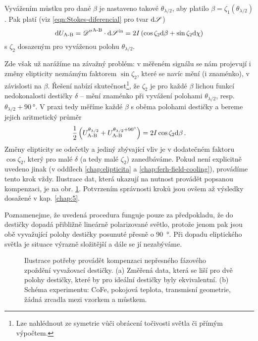 Vyvážením můstku pro dané $\beta$ je nastaveno takové $\theta_{\lambda/2}$, aby platilo $\beta=\zeta_1(\theta_{\lambda/2})$.
Pak platí (viz \eqref{eqn:Stokes-diferencial} pro tvar $\textrm{d}\mathscr{S}$)
\begin{equation}
\label{eqn:mustek-s-elipticitou}
    \textrm{d}U_\textrm{A-B} = {\mathscr{D}''}^\textrm{A-B} \cdot \textrm{d}\mathscr{S}^\textrm{in} = 2I\left(\cos\zeta_2 \textrm{d}\beta + \sin\zeta_2\textrm{d}\chi\right) 
\end{equation}
s $\zeta_2$ dosazeným pro vyváženou polohu $\theta_{\lambda/2}$.

Zde však už narážíme na závažný problém: v měřeném signálu se nám projevují i změny elipticity neznámým faktorem $\sin\zeta_2$, které se navíc mění (i znaménko), v závislosti na $\beta$.
Řešení nabízí skutečnost\footnote{Lze nahlédnout ze symetrie vůči obrácení točivosti světla či přímým výpočtem.}, že $\zeta_2$ je pro každé $\beta$ lichou funkcí nedokonalosti destičky $\delta$ -- mění znaménko při vyvážení polohami $\theta_{\lambda/2}$, resp. $\theta_{\lambda/2}+\SI{90}{\degree}$.
V praxi tedy měříme každé $\beta$ s oběma polohami destičky a bereme jejich aritmetický průměr
\begin{equation}
    \frac{1}{2}\left(U_\textrm{A-B}^{\theta_{\lambda/2}}+U_\textrm{A-B}^{\theta_{\lambda/2}+\SI{90}{\degree}}\right) = 2I\cos\zeta_2 \textrm{d}\beta \,.
\end{equation}
Změny elipticity se odečetly a jediný zbývající vliv je v dodatečném faktoru $\cos\zeta_2$, který pro malé $\delta$ (a tedy malé $\zeta_2$) zanedbáváme.
Pokud není explicitně uvedeno jinak (v oddílech \ref{chap:elipticita} a \ref{chap:ferh-field-cooling}), provádíme tento krok vždy.
Ilustrace dat, která ukazují na nutnost provádět popsanou kompenzaci, je na obr. \ref{fig:mustek-desticka-ilustrace}.
Potvrzením správnosti kroků jsou ovšem až výsledky dosažené v kap. \ref{chap:5}.

Poznamenejme, že uvedená procedura funguje pouze za předpokladu, že do destičky dopadá přibližně lineárně polarizované světlo, protože jenom pak jsou obě vyvažující polohy destičky posunuté přesně o \SI{90}{\degree}.
Při dopadu eliptického světla je situace výrazně složitější a dále se jí nezabýváme.

\begin{figure}[htbp]
    \centering
    \caption{Ilustrace potřeby provádět kompenzaci nepřesného fázového zpoždění vyvažovací destičky. (a) Změřená data, která se liší pro dvě polohy destičky, které by pro ideální destičky byly ekvivalentní. (b) Schéma experimentu: CoFe, pokojová teplota, transmisní geometrie, žádná zrcadla mezi vzorkem a můstkem.}
    \label{fig:mustek-desticka-ilustrace}
\end{figure}

